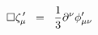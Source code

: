 \begin{equation}
\square \zeta^{\,\prime}_{\mu} \;\; =\;\; {1 \over 3} \partial^{\nu} \phi^{\prime }_{\mu\nu}
\label{eq:c10}
\end{equation}


